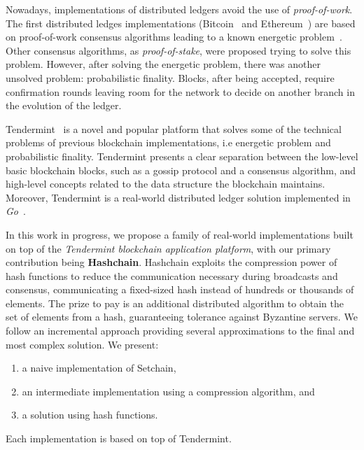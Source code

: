 Nowadays, implementations of distributed ledgers avoid the use of
\emph{proof-of-work}.
%
The first distributed ledges implementations (Bitcoin~\cite{nakamoto06bitcoin}
and Ethereum~\cite{ethereum}) are based on proof-of-work consensus algorithms
leading to a known energetic problem~\cite{energy.problem.bitcoin}.
%
Other consensus algorithms, as \emph{proof-of-stake}, were proposed trying to
solve this problem.
%
However, after solving the energetic problem, there was another unsolved
problem: probabilistic finality.
%
Blocks, after being accepted, require confirmation rounds leaving room for the
network to decide on another branch in the evolution of the ledger.
%

Tendermint~\cite{Buchman.2018.Tendermint} is a novel and popular
platform that solves some of the technical problems of previous blockchain implementations,
i.e energetic problem and probabilistic finality.
%
Tendermint presents a clear separation between the low-level basic blockchain
blocks, such as a gossip protocol and a consensus algorithm, and high-level
concepts related to the data structure the blockchain maintains.
%
Moreover, Tendermint is a real-world distributed ledger solution implemented in
\emph{Go}~\cite{donovan15go}.
%

%
%
In this work in progress, we propose a family
of real-world \setchain implementations built on top of the \emph{Tendermint
blockchain application platform}, with our primary contribution being \textbf{Hashchain}.
%
Hashchain exploits the compression
power of hash functions to reduce the communication necessary during broadcasts
and consensus, communicating a fixed-sized hash instead of hundreds or thousands of
elements.
%
The prize to pay is an additional distributed algorithm to obtain
the set of elements from a hash, guaranteeing tolerance against
Byzantine servers.
%
We follow an incremental approach providing several approximations to the
final and most complex solution. We present:
%
\begin{enumerate}
        \item a naive implementation of Setchain,
        \item an intermediate implementation using a compression algorithm, and
        \item a solution using hash functions.
\end{enumerate}
%
Each implementation is based on top of Tendermint.

